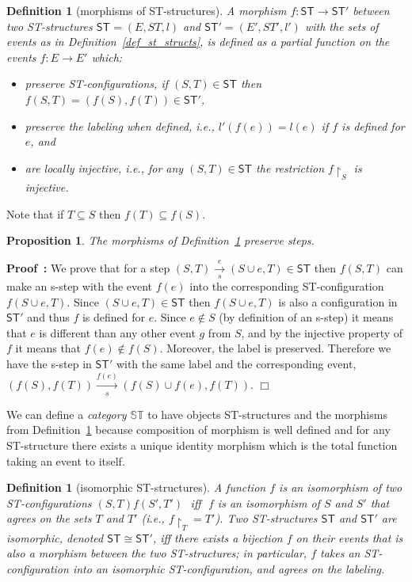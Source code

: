 \documentclass[submission,copyright,creativecommons]{eptcs}
\newtheorem{proposition}[theorem]{Proposition}
\newtheorem{definition}[theorem]{Definition}
\newenvironment{proof}[1][\!\!\,]{\vspace{1ex}\noindent\textbf{Proof #1: }}{\hfill$\Box$\vspace{2ex}}
\newcommand\ST{\ensuremath{\mathsf{ST}}}
\newcommand\allST{\ensuremath{\mathbb{ST}}}
\newcommand\isomorphic{\ensuremath{\cong}}
\newcommand\restrictedToSet[1]{\ensuremath{\!\!\upharpoonright_{#1}}}
\newcommand\categoryST{\ensuremath{\allST}}
\newcommand{\transitionUpDown}[2]{\ensuremath{\xrightarrow[#2]{#1}}}
\begin{document}
\begin{definition}[morphisms of ST-structures]\label{def_morphism_ST}
A \emph{morphism} $f:\ST\rightarrow\ST'$ between two ST-structures $\ST=(E,ST,l)$ and $\ST'=(E',ST',l')$ with the sets of events as in Definition~\ref{def_st_structs}, is defined as a partial function on the events $f:E\rightarrow E'$ which: 
\begin{itemize}
\item 
preserve ST-configurations, if $(S,T)\!\in\!\ST$ then $f(S,T)\!=\!(f(S),f(T))\!\in\!\ST'$,
\item 
preserve the labeling when defined, i.e., $l'(f(e))=l(e)$ if $f$ is defined for $e$, and 
\item
are locally injective, i.e., for any $(S,T)\in\ST$ the restriction $f\restrictedToSet{S}$ is injective.
\end{itemize}
\end{definition}

Note that if $T\subseteq S$ then $f(T)\subseteq f(S)$.

\begin{proposition}
The morphisms of Definition~\ref{def_morphism_ST} preserve steps.
\end{proposition}

\begin{proof}
We prove that for a step $(S,T)\transitionUpDown{e}{s}(S\cup e,T)\in\ST$ then $f(S,T)$ can make an s-step with the event $f(e)$ into the corresponding ST-configuration $f(S\cup e,T)$. Since $(S\cup e,T)\in\ST$ then $f(S\cup e,T)$ is also a configuration in $\ST'$ and thus $f$ is defined for $e$. Since $e\not\in S$ (by definition of an s-step) it means that $e$ is different than any other event $g$ from $S$, and by the injective property of $f$ it means that $f(e)\not\in f(S)$. Moreover, the label is preserved. Therefore we have the s-step in $\ST'$ with the same label and the corresponding event, $(f(S),f(T))\transitionUpDown{f(e)}{s}(f(S)\cup f(e),f(T))$.
\end{proof}

We can define a \textit{category \categoryST} to have objects ST-structures and the morphisms from Definition~\ref{def_morphism_ST} because composition of morphism is well defined and for any ST-structure there exists a unique identity morphism which is the total function taking an event to itself.

\begin{definition}[isomorphic ST-structures]\label{def_isomorphism}
A function $f$ is an \emph{isomorphism} of two ST-configurations $(S,T)f(S',T')$\,\ iff\,\ $f$ is an isomorphism of $S$ and $S'$ that agrees on the sets $T$ and $T'$ (i.e., $f\!\!\!\upharpoonright_{T}=T'$).
Two ST-structures $\ST$ and $\ST'$ are isomorphic, denoted $\ST\isomorphic\ST'$, iff there exists a bijection $f$ on their events that is also a morphism between the two ST-structures; in particular, $f$ takes an ST-configuration into an isomorphic ST-configuration, and agrees on the labeling.
\end{definition}
\end{document}
